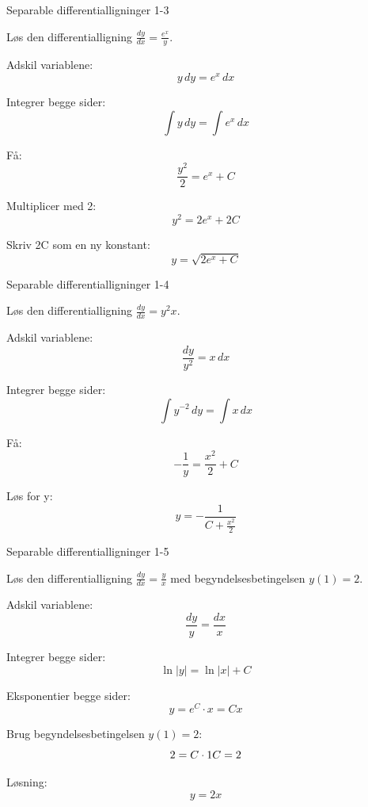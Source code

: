 \documentclass{article}
\begin{document}
\begin{exercise}{Separable differentialligninger 1-3}

Løs den differentialligning $\frac{dy}{dx} = \frac{e^x}{y}$.


\hint

Adskil variablene:
\[
y \, dy = e^x \, dx
\]

\hint

Integrer begge sider:
\[
\int y \, dy = \int e^x \, dx
\]

\hint

Få:
\[
\frac{y^2}{2} = e^x + C
\]

\hint

Multiplicer med 2:
\[
y^2 = 2e^x + 2C
\]

\hint

Skriv 2C som en ny konstant:
\[
y = \sqrt{2e^x + C}
\]

\end{exercise}

\newpage

\begin{exercise}{Separable differentialligninger 1-4}

Løs den differentialligning $\frac{dy}{dx} = y^2 x$.


\hint

Adskil variablene:
\[
\frac{dy}{y^2} = x \, dx
\]

\hint

Integrer begge sider:
\[
\int y^{-2} \, dy = \int x \, dx
\]

\hint

Få:
\[
-\frac{1}{y} = \frac{x^2}{2} + C
\]

\hint

Løs for y:
\[
y = -\frac{1}{C + \frac{x^2}{2}}
\]

\end{exercise}

\newpage

\begin{exercise}{Separable differentialligninger 1-5}

Løs den differentialligning $\frac{dy}{dx} = \frac{y}{x}$ med begyndelsesbetingelsen $y(1) = 2$.


\hint

Adskil variablene:
\[
\frac{dy}{y} = \frac{dx}{x}
\]

\hint

Integrer begge sider:
\[
\ln|y| = \ln|x| + C
\]

\hint

Eksponentier begge sider:
\[
y = e^C \cdot x = Cx
\]

\hint

Brug begyndelsesbetingelsen $y(1) = 2$:
\[
2 = C \cdot 1 \\ C = 2
\]

\hint

Løsning:
\[
y = 2x
\]

\end{exercise}
\end{document}
